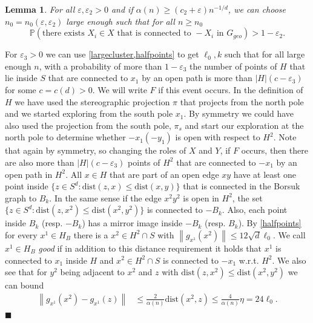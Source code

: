 \documentclass[11pt]{article}%
\newenvironment{proof}{\vspace{1ex}\noindent{\bf Proof.}}{\hspace*{\fill}$\blacksquare$\vspace{1ex}}
\newtheorem{lemma}[lemma]{Lemma}
\newcommand{\norm}[1]{\ensuremath{\left\|#1\right\|}}
\newcommand{\eps}{\varepsilon}
\newcommand{\Pro}{\mathbb{P}}
\newcommand{\dists}{{\mathrm{dist}}}
\begin{document}
\begin{lemma}\label{oddcycle}
	For all $ \eps,\eps_2>0 $ and if $  \alpha(n)\geq (c_2+\eps)n^{-1/d} $, we can choose $ n_0=n_0(\eps,\eps_2) $ large enough such that for all $ n\geq n_0 $
	\begin{equation*}
		\Pro(\text{there exists }X_i\in X\text{ that is connected to }-X_i\text{ in }  G_{geo})>1-\eps_2.
	\end{equation*}
\end{lemma}


\begin{proof}
	For $ \eps_3>0$ we can use \cref{largecluster,halfpoints} to get $ \ell_0,k  $ such that for all large enough $ n $, with a probability of more than $ 1-\eps_3 $ the number of points of $ H $ that lie inside $ S $ that are connected to $ x_1 $ by an open path is more than $ |H|(c-\eps_3) $ for some $c=c(d)>0$. We will write $ F $ if this event occurs. In the definition of $ H $ we have used the stereographic projection $ \pi $ that projects from the north pole and we started exploring from the south pole $ x_1 $. By symmetry we could have also used the projection from the south pole, $ \pi_{s} $ and start our exploration at the north pole to determine whether  $ -x_1(-y_1) $ is open with respect to $H^2$. Note that again by symmetry, so changing the roles of $ X $ and $ Y $, if $ F $ occurs, then there are also more than $ |H|(c-\eps_3) $ points of $ H^2 $ that are connected to $ -x_1 $ by an open path in $ H^2 $. All $ x\in H $ that are part of an open edge $ xy $ have at least one point inside $ \{z\in S^d:\dists(z,x)\leq\dists(x,y) \} $ that is connected in the Borsuk graph to $ B_k $. In the same sense if the edge $ x^2y^2 $ is open in $ H^2 $, the set $ \{z\in S^d:\dists(z,x^2)\leq\dists(x^2,y^2) \} $ is connected to $ -B_k $. Also, each point inside $ B_k $ (resp. $ -B_k $) has a mirror image inside $ -B_k $ (resp. $ B_k $). By \cref{halfpoints} for every $x^1\in H_B$ there is a $x^2\in H^2\cap S$ with $ \norm{g_{x^1}{(x^2)}}\leq 12\sqrt{d}\ell_0 $. We call $ x^1\in H_B $ \textit{good} if in addition to this distance requirement it holds that $ x^1 $ is connected to $ x_1 $ inside $ H $ and $ x^2\in H^2\cap S $ is connected to $ -x_1 $ w.r.t. $ H^2 $. We also see that for $ y^2 $ being adjacent to $ x^2 $ and $ z$ with $ \dists(z,x^2)\leq\dists(x^2,y^2) $ we can bound 
	\begin{equation*}
		\begin{split}
			\norm{g_{x^1}(x^2)-g_{x^1}(z)}&\leq \frac{2}{\alpha(n)}\dists(x^2,z)\leq \frac{4}{\alpha(n)}\eta= 24 \ell_0.

\end{split}
\end{equation*}
\end{proof}
\end{document}
